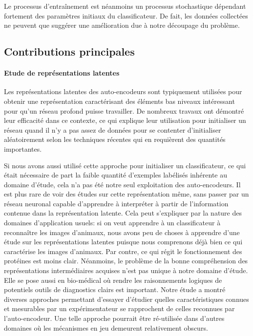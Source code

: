 \documentclass[a4paper, 11pt, onecolumn]{article}
\begin{document}
Le processus
d'entraînement est néanmoins un processus stochastique dépendant fortement des
paramètres initiaux du classificateur. De fait, les données collectées ne
peuvent que suggérer une amélioration due à notre découpage du problème.

\subsection{Contributions principales}

\paragraph{Etude de représentations latentes}

Les représentations latentes des auto-encodeurs sont typiquement utilisées pour
obtenir une représentation caractérisant des éléments bas niveaux intéressant
pour qu'un réseau profond puisse travailler. De nombreux travaux ont démontré
leur efficacité dans ce contexte, ce qui explique leur utilisation pour
initialiser un réseau quand il n'y a pas assez de données pour se contenter
d'initialiser aléatoirement selon les techniques récentes qui en requièrent des
quantités importantes.

Si nous avons aussi utilisé cette approche pour initialiser un classificateur,
ce qui était nécessaire de part la faible quantité d'exemples labélisés
inhérente au domaine d'étude, cela n'a pas été notre seul exploitation des
auto-encodeurs. Il est plus rare de voir des études sur cette représentation même,
sans passer par un réseau neuronal capable d'apprendre à interpréter à partir de
l'information contenue dans la représentation latente. Cela peut s'expliquer par
la nature des domaines d'application usuels: si on veut apprendre à un
classificateur à reconnaître les images d'animaux, nous avons peu de choses à
apprendre d'une étude sur les représentations latentes puisque nous comprenons
déjà bien ce qui caractérise les images d'animaux. Par contre, ce qui régit le
fonctionnement des protéines est moins clair. Néanmoins, le problème de la bonne compréhension des représentations intermédiaires
acquises n'est pas unique à notre domaine d'étude. Elle se pose aussi en bio-médical où rendre les raisonnements logiques de potentiels outils
de diagnostics clairs est important. Notre étude a montré diverses
approches permettant d'essayer d'étudier quelles caractéristiques connues et
mesurables par un expérimentateur se rapprochent de celles reconnues par
l'auto-encodeur. Une telle approche pourrait être ré-utilisée dans d'autres
domaines où les mécanismes en jeu demeurent relativement obscurs.
\end{document}
